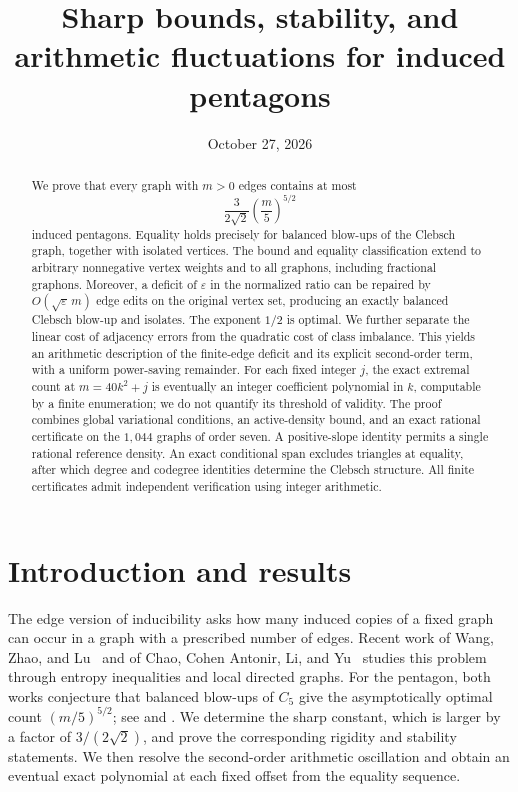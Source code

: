 \documentclass[11pt]{amsart}
\title[Induced pentagons with an edge constraint]{Sharp bounds, stability, and arithmetic fluctuations for induced pentagons}
\author{}
\date{October 27, 2026}
\theoremstyle{definition}
\theoremstyle{remark}
\begin{document}
\begin{abstract}
We prove that every graph with \(m>0\) edges contains at most
\[
 \frac{3}{2\sqrt{2}}\left(\frac{m}{5}\right)^{5/2}
\]
induced pentagons. Equality holds precisely for balanced blow-ups of the
Clebsch graph, together with isolated vertices. The bound and equality
classification extend to arbitrary nonnegative vertex weights and to all
graphons, including fractional graphons. Moreover, a deficit of
\(\varepsilon\) in the normalized ratio can be repaired by
\(O(\sqrt{\varepsilon}\,m)\) edge edits on the original vertex set,
producing an exactly balanced Clebsch blow-up and isolates. The exponent
\(1/2\) is optimal. We further separate the linear cost of adjacency errors
from the quadratic cost of class imbalance. This yields an arithmetic
description of the finite-edge deficit and its explicit second-order term,
with a uniform power-saving remainder. For each fixed integer \(j\), the
exact extremal count at \(m=40k^2+j\) is eventually an integer coefficient
polynomial in \(k\), computable by a finite enumeration; we do not quantify
its threshold of validity. The proof combines global variational conditions,
an active-density bound, and an exact rational certificate on the
\(1{,}044\) graphs of order seven. A positive-slope identity permits a
single rational reference density. An exact conditional span excludes
triangles at equality, after which degree and codegree identities determine
the Clebsch structure. All finite certificates admit independent
verification using integer arithmetic.
\end{abstract}


\maketitle

\section{Introduction and results}

The edge version of inducibility asks how many induced copies of a fixed
graph can occur in a graph with a prescribed number of edges. Recent work
of Wang, Zhao, and Lu~\cite{Wang2026} and of Chao, Cohen Antonir, Li, and
Yu~\cite{Chao2025} studies this problem through entropy inequalities and
local directed graphs. For the pentagon, both works conjecture that balanced
blow-ups of \(C_5\) give the asymptotically optimal count
\((m/5)^{5/2}\); see \cite[Conjecture~8]{Wang2026} and
\cite[Conjecture~1.7]{Chao2025}. We determine the sharp constant, which is
larger by a factor of \(3/(2\sqrt{2})\), and prove the corresponding rigidity
and stability statements. We then resolve the second-order arithmetic
oscillation and obtain an eventual exact polynomial at each fixed offset
from the equality sequence.
\end{document}
